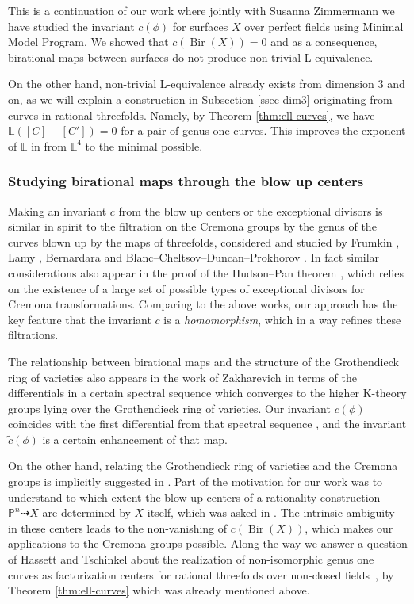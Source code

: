 \documentclass[a4paper,12pt]{amsart}
\def\L{\mathbb L}
\def\P{\mathbb P}
\def\Bir{{\operatorname{Bir}}}
\theoremstyle{plain}
\numberwithin{equation}{section}
\theoremstyle{definition}
\newcommand{\ti}[1]{\tilde{#1}}
\renewcommand{\(}{\left(}
\renewcommand{\)}{\right)}
\newcommand{\dto}{\dashrightarrow}
\begin{document}
This is a continuation of our work \cite{LSZ20} where
jointly with Susanna Zimmermann we have studied
the invariant $c(\phi)$ for surfaces $X$ over perfect fields 
using Minimal Model Program.
We showed that
$c(\Bir(X)) = 0$ 
and as a consequence, birational maps between surfaces 
do not produce non-trivial L-equivalence.

On the other hand, 
non-trivial L-equivalence
already exists from dimension $3$ and on,
as we will
explain a construction in Subsection \ref{ssec-dim3} originating from curves in rational threefolds. 
Namely, by Theorem \ref{thm:ell-curves}, we have $\L([C] - [C']) = 0$ for a pair of genus one curves.
This improves the exponent of $\L$ in 
\cite{ShinderZhang} from $\L^4$ to the minimal possible.





\subsubsection{Studying birational maps through the blow up centers} 
\hfill

Making an invariant $c$ from the blow up centers
or the exceptional divisors is similar in spirit 
to the filtration on the Cremona groups by the 
genus of the curves blown up by 
the maps
of threefolds,
considered and studied
by Frumkin \cite{Frumkin-Cremona},
Lamy
\cite{Lamy-Cremona}, Bernardara \cite{Bernardara-Cremona}
and Blanc--Cheltsov--Duncan--Prokhorov \cite{BCDP}.
In fact similar considerations also appear in 
the proof of the Hudson--Pan theorem
\cite{HudsonPan}, which relies on 
the existence of a large
set of possible types of exceptional divisors
for Cremona transformations.
Comparing to the above works,
our approach has the key feature
that the invariant $c$ is a \emph{homomorphism}, which in a way
refines these filtrations.

The relationship between birational maps and the structure
of the Grothendieck ring of varieties also
appears in the work
of Zakharevich in terms of the differentials
in a certain spectral sequence \cite{Zakharevich}
which converges to the higher K-theory groups
lying over
the Grothendieck ring of varieties.
Our invariant $c(\phi)$ coincides with the first
differential from that spectral sequence \cite[Lemma 3.2]{Zakharevich},
and the invariant $\ti{c}(\phi)$ is a certain
enhancement of that map.


On the other hand, relating the Grothendieck
ring of varieties and the Cremona groups is
implicitly suggested in \cite{HassettLai}.
Part of the motivation for our work was to understand
to which extent the blow up centers of a rationality construction $\P^n \dto X$ are determined
by $X$ itself, which was asked in \cite[Introduction]{HassettLai}.
The intrinsic ambiguity in these centers 
leads to the non-vanishing of $c(\Bir(X))$,
which makes our applications to the Cremona groups possible.
Along the way we answer a question
of Hassett and Tschinkel about the 
realization of non-isomorphic genus one curves as
 factorization centers 
for rational threefolds over non-closed fields~\cite[Remark 23 (2)]{HassettTschinkelCycle}, by Theorem \ref{thm:ell-curves} which
was already mentioned above.
\end{document}

